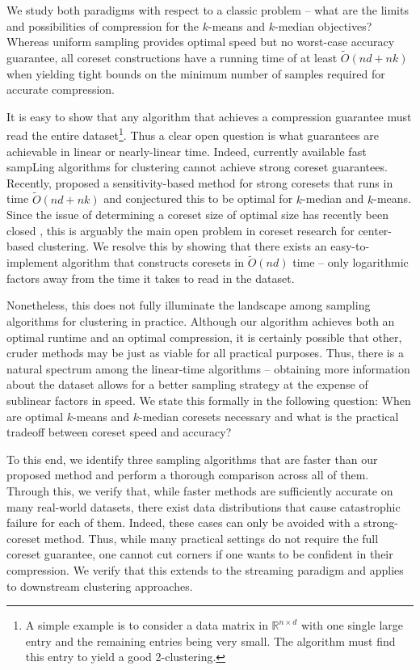 We study both paradigms with respect to a classic problem -- what are the limits and possibilities of compression for the $k$-means and $k$-median objectives?
Whereas uniform sampling provides optimal speed but no worst-case accuracy guarantee, all coreset constructions have a running time of at least
$\tilde{O}(nd+nk)$ when yielding tight bounds on the minimum number of samples required for accurate compression. 

It is easy to show that any algorithm that achieves a compression guarantee must read the entire dataset\footnote{A simple example is to consider a data matrix
in $\mathbb{R}^{n \times d}$ with one single large entry and the remaining entries being very small. The algorithm must find this entry to yield a good
2-clustering.}. Thus a clear open question is what guarantees are achievable in linear or nearly-linear time. Indeed, currently available fast sampLing
algorithms for clustering \cite{lightweight_coresets} \cite{kmeans_sublinear_bachem16} cannot achieve strong coreset guarantees.  Recently, \cite{DSWY22} proposed
a sensitivity-based method for strong coresets that runs in time $\tilde{O}(nd + nk)$ and conjectured this to be optimal for $k$-median and $k$-means.  Since
the issue of determining a coreset size of optimal size has recently been closed \cite{CSS21,CLSSS22,huangLB}, this is arguably the main open problem in coreset
research for center-based clustering. We resolve this by showing that there exists an easy-to-implement algorithm that constructs coresets in $\tilde{O}(nd)$
time -- only logarithmic factors away from the time it takes to read in the dataset.

Nonetheless, this does not fully illuminate the landscape among sampling algorithms for clustering in practice. Although our algorithm achieves both an optimal
runtime and an optimal compression, it is certainly possible that other, cruder methods may be just as viable for all practical purposes.  Thus, there is
a natural spectrum among the linear-time algorithms -- obtaining more information about the dataset allows for a better sampling strategy at the expense of
sublinear factors in speed. We state this formally in the following question: When are optimal $k$-means and $k$-median coresets necessary and what is the
practical tradeoff between coreset speed and accuracy?

To this end, we identify three sampling algorithms that are faster than our proposed method and perform a thorough comparison across all of them. Through this,
we verify that, while faster methods are sufficiently accurate on many real-world datasets, there exist data distributions that cause catastrophic failure for
each of them. Indeed, these cases can only be avoided with a strong-coreset method. Thus, while many practical settings do not require the full coreset
guarantee, one cannot cut corners if one wants to be confident in their compression. We verify that this extends to the streaming paradigm and applies to
downstream clustering approaches.

